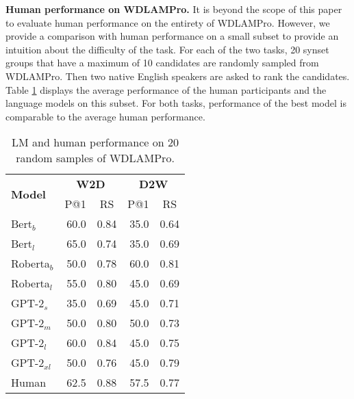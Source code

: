\documentclass[11pt,a4paper]{article}
\begin{document}
\textbf{Human performance on WDLAMPro.}  It is beyond the
scope of this paper to evaluate human performance on the
entirety of WDLAMPro. However, we provide a comparison with
human performance on a small subset to provide
an intuition about the difficulty of the task. For each of
the two tasks, 20 synset groups that have a maximum of 10
candidates are randomly sampled from WDLAMPro. Then two
native English speakers are asked to rank the
candidates. Table \ref{tab:human_eval} displays the average
performance of the human participants and the language
models on this subset. For both tasks, performance of the
best model is comparable to the average human performance.



\begin{table}
    \centering
    \begin{tabular}{l|rrrr}
        \hline
         \multirow{2}{*}{\textbf{Model}} & \multicolumn{2}{c}{\textbf{W2D}} & \multicolumn{2}{c}{\textbf{D2W}} \\
         & \multicolumn{1}{c}{P@1} & \multicolumn{1}{c}{RS} & \multicolumn{1}{c}{P@1} & \multicolumn{1}{c}{RS} \\ \hline
     Bert$_{b}$ & 60.0 & 0.84 & 35.0 & 0.64 \\
     Bert$_{l}$ & 65.0 & 0.74 & 35.0 & 0.69 \\
     Roberta$_{b}$ & 50.0 & 0.78 & 60.0 & 0.81 \\
     Roberta$_{l}$ & 55.0 & 0.80 & 45.0 & 0.69 \\ \hline
     GPT-2$_{s}$ & 35.0 & 0.69 & 45.0 & 0.71 \\
     GPT-2$_{m}$ & 50.0 & 0.80 & 50.0 & 0.73 \\
     GPT-2$_{l}$ & 60.0 & 0.84 & 45.0 & 0.75 \\
     GPT-2$_{xl}$ & 50.0 & 0.76 & 45.0 & 0.79 \\ \hline 
     Human & 62.5 & 0.88 & 57.5 & 0.77 \\ \hline 
     
    \end{tabular}
    \caption{LM and human performance on 20 random samples of WDLAMPro. }
    \label{tab:human_eval}
\end{table}
\end{document}
